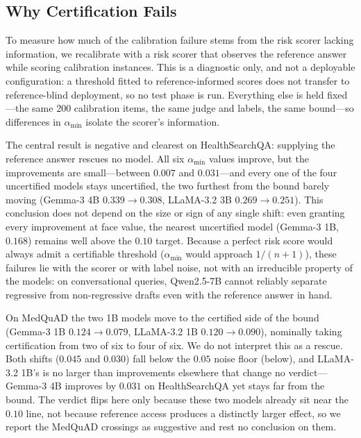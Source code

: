 \documentclass[sigconf, review, anonymous]{acmart}
\begin{document}
\subsection{Why Certification Fails}
\label{sec:oracle}

To measure how much of the calibration failure stems from the risk scorer
lacking information, we recalibrate with a risk scorer that observes the
reference answer while scoring calibration instances. This is a diagnostic
only, and not a deployable configuration: a threshold fitted to
reference-informed scores does not transfer to reference-blind deployment,
so no test phase is run. Everything else is held fixed---the same 200
calibration items, the same judge and labels, the same bound---so
differences in $\alpha_{\min}$ isolate the scorer's information.

The central result is negative and clearest on HealthSearchQA: supplying the
reference answer rescues no model. All six $\alpha_{\min}$ values improve, but
the improvements are small---between $0.007$ and $0.031$---and every one of the
four uncertified models stays uncertified, the two furthest from the bound
barely moving (Gemma-3 4B $0.339\to0.308$, LLaMA-3.2 3B $0.269\to0.251$). This
conclusion does not depend on the size or sign of any single shift: even
granting every improvement at face value, the nearest uncertified model
(Gemma-3 1B, $0.168$) remains well above the $0.10$ target. Because a
perfect risk score would always admit a certifiable threshold ($\alpha_{\min}$
would approach $1/(n+1)$), these failures lie with the scorer or with label
noise, not with an irreducible property of the models: on conversational
queries, Qwen2.5-7B cannot reliably separate regressive from non-regressive
drafts even with the reference answer in hand.

On MedQuAD the two 1B models move to the certified side of the bound (Gemma-3
1B $0.124\to0.079$, LLaMA-3.2 1B $0.120\to0.090$), nominally taking
certification from two of six to four of six. We do not interpret this as a
rescue. Both shifts ($0.045$ and $0.030$) fall below the $0.05$ noise floor
(below), and LLaMA-3.2 1B's is no larger than improvements elsewhere that
change no verdict---Gemma-3 4B improves by $0.031$ on HealthSearchQA yet
stays far from the bound. The verdict flips here only
because these two models already sit near the $0.10$ line, not because
reference access produces a distinctly larger effect, so we report the MedQuAD
crossings as suggestive and rest no conclusion on them.
\end{document}

